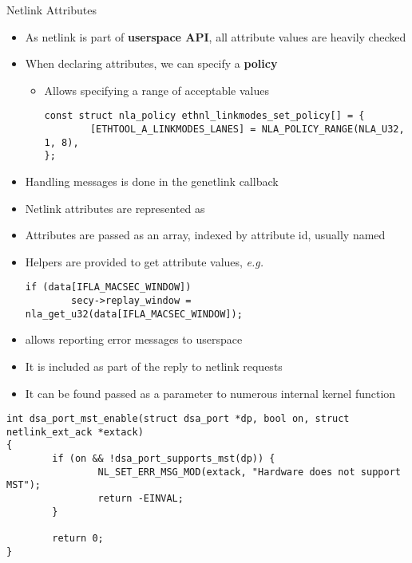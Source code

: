 \begin{frame}[fragile]{Netlink Attributes}
	\begin{itemize}
		\item As netlink is part of \textbf{userspace API}, all attribute values are heavily checked
		\item When declaring attributes, we can specify a \textbf{policy}
			\begin{itemize}
				\item Allows specifying a range of acceptable values
					\begin{verbatim}
const struct nla_policy ethnl_linkmodes_set_policy[] = {
        [ETHTOOL_A_LINKMODES_LANES] = NLA_POLICY_RANGE(NLA_U32, 1, 8),
};
					\end{verbatim}
			\end{itemize}
		\item Handling messages is done in the genetlink  callback
		\item Netlink attributes are represented as 
		\item Attributes are passed as an array, indexed by attribute id, usually named 
		\item Helpers are provided to get attribute values, \textit{e.g.} 
		\begin{verbatim}
if (data[IFLA_MACSEC_WINDOW])
        secy->replay_window = nla_get_u32(data[IFLA_MACSEC_WINDOW]);
		\end{verbatim}
	\end{itemize}
\end{frame}

\begin{frame}[fragile]{}
	\begin{itemize}
		\item {} allows reporting error messages to userspace
		\item It is included as part of the reply to netlink requests
		\item It can be found passed as a parameter to numerous internal kernel function
	\end{itemize}
	{\fontsize{9}{10}
	\begin{verbatim}
int dsa_port_mst_enable(struct dsa_port *dp, bool on, struct netlink_ext_ack *extack)
{
        if (on && !dsa_port_supports_mst(dp)) {
                NL_SET_ERR_MSG_MOD(extack, "Hardware does not support MST");
                return -EINVAL;
        }

        return 0;
}
	\end{verbatim}
	}
\end{frame}

